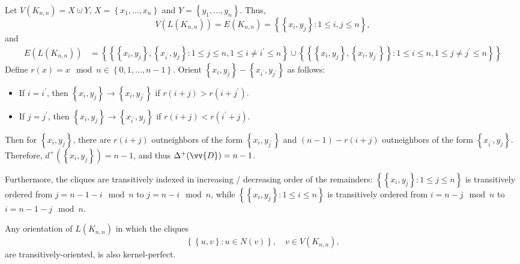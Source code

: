 \begin{explanation}
    Let \(V(K_{n, n}) = X \cupdot Y\), \(X = \left\{ x_1, \dots , x_n \right\} \) and \(Y = \left\{ y_1, \dots , y_n \right\} \). Thus,
    \[
        V(L(K_{n, n})) = E(K_{n, n}) = \left\{ \left\{ x_i, y_j \right\}: 1 \le i, j \le n  \right\},
    \]   
    and 
    \begin{align*}
        E(L(K_{n, n})) &= \left\{ \left\{ \left\{ x_i, y_j \right\}, \left\{ x_{i^{\prime} }, y_j \right\}: 1 \le j \le n, 1 \le i \neq i^{\prime} \le n   \right\} \cup \left\{ \left\{ \left\{ x_i, y_j \right\}, \left\{ x_i, y_{j^{\prime} } \right\}   \right\}: 1 \le i \le n, 1 \le j \neq j^{\prime} \le n  \right\}  \right\} 
    \end{align*}
    Define \(r(x) = x \mod n \in \left\{ 0, 1, \dots , n - 1 \right\} \). Orient \(\left\{ x_i, y_j \right\} - \left\{ x_{i^{\prime} }, y_{j^{\prime} } \right\}  \) as follows:
    \begin{itemize}
        \item If \(i = i^{\prime} \), then \(\left\{ x_i, y_j \right\} \to \left\{ x_i, y_{j^{\prime} } \right\}  \) if \(r(i + j) > r(i + j^{\prime})\). 
        \item If \(j = j^{\prime} \), then \(\left\{ x_i, y_j \right\} \to \left\{ x_{i^{\prime} }, y_j \right\}  \) if \(r(i + j) < r(i^{\prime} + j)\).
    \end{itemize}  
    Then for \(\left\{ x_i, y_j \right\} \), there are \(r(i + j)\) outneighbors of the form \(\left\{ x_i, y_{j^{\prime} } \right\} \) and \((n - 1) - r(i + j)\) outneighbors of the form \(\left\{ x_{i^{\prime} }, y_j \right\} \). Therefore, \(d^+ (\left\{ x_i, y_j \right\} ) = n - 1\), and thus \(\Delta ^+(\vv{D}) = n - 1\). 

    Furthermore, the cliques are transitively indexed in increasing / decreasing order of the remainders: \(\left\{ \left\{ x_i, y_j \right\}: 1 \le j \le n  \right\} \) is transitively ordered from \(j = n - 1 - i \mod n\) to \(j = n - i \mod n\), while \(\left\{ \left\{ x_i, y_j \right\}: 1 \le i \le n  \right\} \) is transitively ordered from \(i = n - j \mod n\) to \(i = n - 1 - j \mod n\).             
\end{explanation}

\begin{claim}
    Any orientation of \(L(K_{n, n})\) in which the cliques 
    \[
        \left\{ \left\{ u, v \right\}: u \in N(v)  \right\}, \quad v \in V(K_{n, n}), 
    \]
    are transitively-oriented, is also kernel-perfect.
\end{claim}

